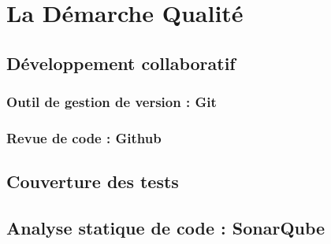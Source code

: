 \chapter{La Démarche Qualité}
\section{Développement collaboratif}
\subsection{Outil de gestion de version : Git}

\subsection{Revue de code : Github}

\section{Couverture des tests}

\section{Analyse statique de code : SonarQube}